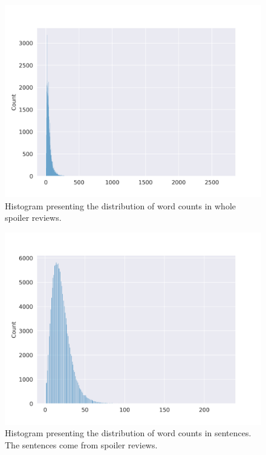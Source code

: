 \documentclass[11pt]{article}
\begin{document}
\begin{figure}
    \centering
    \includegraphics[width=\columnwidth]{img/eda/word_count_per_spoiler_review.png}
    \caption{Histogram presenting the distribution of word counts in whole spoiler reviews.} 
    \label{fig:words_count_per_spoiler_review}
\end{figure}

\begin{figure}
    \centering
    \includegraphics[width=\columnwidth]{img/eda/word_count_per_sencence_in_spoiler_review.png}
    \caption{Histogram presenting the distribution of word counts in sentences. The sentences come from spoiler reviews.} 
    \label{fig:word_count_per_sentence_in_spoiler_review}
\end{figure}
\end{document}

